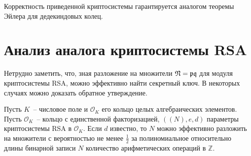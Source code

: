 \documentclass[_00_dissertation.tex]{subfiles}
\begin{document}
\begin{remark}
    Корректность приведенной криптосистемы гарантируется аналогом теоремы Эйлера для дедекиндовых колец.
\end{remark}

\section{Анализ аналога криптосистемы RSA}

Нетрудно заметить, что, зная разложение на множители $\mathfrak{N} = \mathfrak{p}\mathfrak{q}$ для модуля криптосистемы RSA, можно эффективно найти секретный ключ.
В некоторых случаях можно доказать обратное утверждение.

\begin{theorem}\label{theorem:factor}
    Пусть $K$~-- числовое поле и $\mathcal{O}_K$ его кольцо целых алгебраических элементов.
    Пусть $\mathcal{O}_K$~-- кольцо с единственной факторизацией, $((N), e, d)$ параметры криптосистемы RSA в $\mathcal{O}_K$.
    Если $d$ известно, то $N$ можно эффективно разложить на множители с вероятностью не менее $\frac{1}{2}$ за полиномиальное относительно длины бинарной записи $N$ количество арифметических операций в $\mathbb{Z}$.
\end{theorem}
\end{document}
